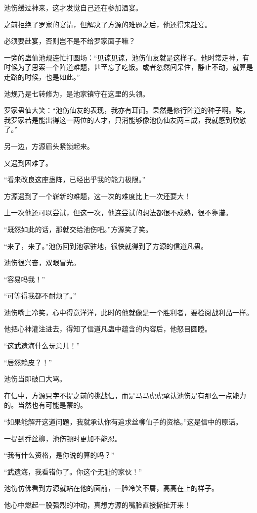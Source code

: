 \begin{this_body}
池伤缓过神来，这才发觉自己还在参加酒宴。

之前拒绝了罗家的宴请，但解决了方源的难题之后，他还得来赴宴。

必须要赴宴，否则岂不是不给罗家面子嘛？

一旁的蛊仙池规连忙打圆场：“见谅见谅，池伤仙友就是这样子。他时常走神，有时候为了思索一个阵道难题，甚至忘了吃饭。或者忽然间呆住，静止不动，就算是走路的时候，也是如此。”

池规乃是七转修为，是池家镇守在这里的头领。

罗家蛊仙大笑：“池伤仙友的表现，我亦有耳闻。果然是修行阵道的种子啊。唉，我罗家若是能出得这一两位的人才，只消能够像池伤仙友两三成，我就感到欣慰了。”

另一边，方源眉头紧锁起来。

又遇到困难了。

“看来改良这座蛊阵，已经出乎我的能力极限。”

方源遇到了一个崭新的难题，这一次的难度比上一次还要大！

上一次他还可以尝试，但这一次，他连尝试的想法都很不成熟，很不靠谱。

“既然如此的话，那就交给池伤吧。”方源笑了笑。

“来了，来了。”池伤回到池家驻地，很快就得到了方源的信道凡蛊。

池伤很兴奋，双眼冒光。

“容易吗我！”

“可等得我都不耐烦了。”

池伤嘴上冷笑，心中得意洋洋，此时的他就像是一个胜利者，要检阅战利品一样。

他把心神灌注进去，得知了信道凡蛊中蕴含的内容后，他怒目圆瞪。

“这武遗海什么玩意儿！”

“居然赖皮？！”

池伤当即破口大骂。

在信中，方源只字不提之前的挑战信，而是马马虎虎承认池伤是有那么一点能力的。当然也有可能是蒙的。

“如果能解开这道问题，我就承认你有追求丝柳仙子的资格。”这是信中的原话。

一提到乔丝柳，池伤顿时更加不能忍。

“我有什么资格，是你说的算的吗？”

“武遗海，我看错你了。你这个无耻的家伙！”

池伤仿佛看到方源就站在他的面前，一脸冷笑不屑，高高在上的样子。

他心中燃起一股强烈的冲动，真想方源的嘴脸直接撕扯开来！


\end{this_body}
